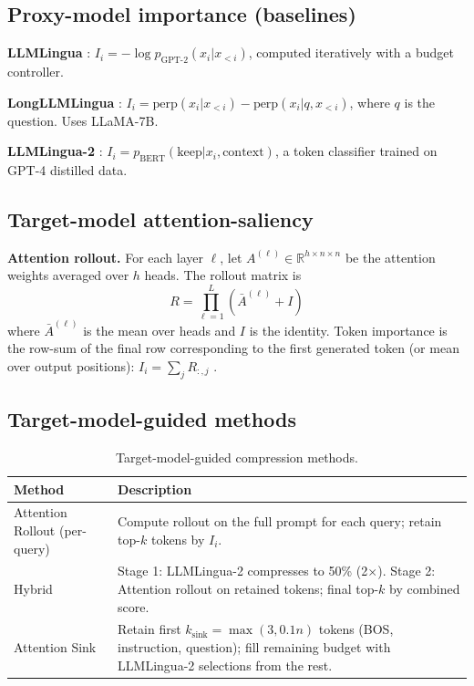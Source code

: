 \documentclass[11pt,letterpaper]{article}
\begin{document}
\subsection{Proxy-model importance (baselines)}
\textbf{LLMLingua} \citep{Jiang2023}: $I_i = -\log p_{\text{GPT-2}}(x_i | x_{<i})$, computed iteratively with a budget controller.

\textbf{LongLLMLingua} \citep{Jiang2024}: $I_i = \text{perp}(x_i|x_{<i}) - \text{perp}(x_i|q, x_{<i})$, where $q$ is the question. Uses LLaMA-7B.

\textbf{LLMLingua-2} \citep{Pan2024}: $I_i = p_{\text{BERT}}(\text{keep} | x_i, \text{context})$, a token classifier trained on GPT-4 distilled data.

\subsection{Target-model attention-saliency}
\textbf{Attention rollout.} For each layer $\ell$, let $A^{(\ell)} \in \mathbb{R}^{h \times n \times n}$ be the attention weights averaged over $h$ heads. The rollout matrix is
$$R = \prod_{\ell=1}^L \left( \bar{A}^{(\ell)} + I \right)$$
where $\bar{A}^{(\ell)}$ is the mean over heads and $I$ is the identity. Token importance is the row-sum of the final row corresponding to the first generated token (or mean over output positions): $I_i = \sum_j R_{:,j}$ \citep{Abnar2020}.

\subsection{Target-model-guided methods}

\begin{table}[!htbp]
\centering
\caption{Target-model-guided compression methods.}
\label{tab:methods}
\small
\begin{tabular}{l p{10cm}}
\toprule
Method & Description \\
\midrule
Attention Rollout (per-query) & Compute rollout on the full prompt for each query; retain top-$k$ tokens by $I_i$. \\
Hybrid & Stage 1: LLMLingua-2 compresses to 50\% (2$\times$). Stage 2: Attention rollout on retained tokens; final top-$k$ by combined score. \\
Attention Sink & Retain first $k_{\text{sink}} = \max(3, 0.1n)$ tokens (BOS, instruction, question); fill remaining budget with LLMLingua-2 selections from the rest. \\
\bottomrule
\end{tabular}
\end{table}
\end{document}
